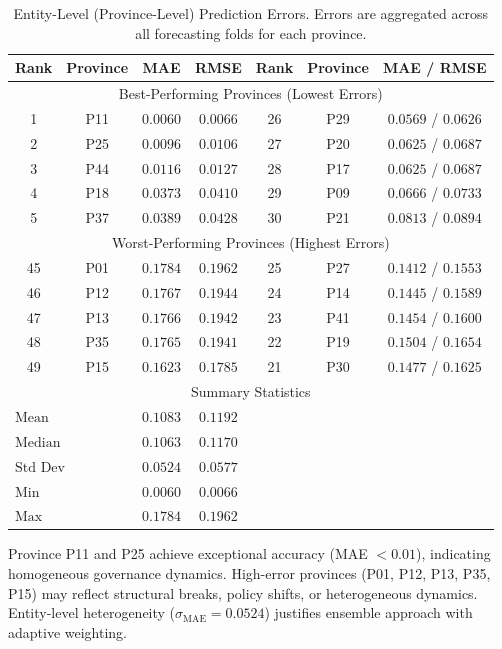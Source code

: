 \begin{table}[!htbp]
\centering
\caption{%
    Entity-Level (Province-Level) Prediction Errors.
    Errors are aggregated across all forecasting folds for each province.
}
\label{tab:entity_errors}
\small
\begin{tabular}{ccccccc}
\toprule
\multicolumn{1}{c}{\textbf{Rank}} & \textbf{Province} & \textbf{MAE} & \textbf{RMSE} 
    & \multicolumn{1}{c}{\textbf{Rank}} & \textbf{Province} & \textbf{MAE} / \textbf{RMSE} \\
\midrule
\multicolumn{7}{c}{\small Best-Performing Provinces (Lowest Errors)} \\
1  & P11 & $0.0060$ & $0.0066$ & 26 & P29 & $0.0569$ / $0.0626$ \\
2  & P25 & $0.0096$ & $0.0106$ & 27 & P20 & $0.0625$ / $0.0687$ \\
3  & P44 & $0.0116$ & $0.0127$ & 28 & P17 & $0.0625$ / $0.0687$ \\
4  & P18 & $0.0373$ & $0.0410$ & 29 & P09 & $0.0666$ / $0.0733$ \\
5  & P37 & $0.0389$ & $0.0428$ & 30 & P21 & $0.0813$ / $0.0894$ \\
\midrule
\multicolumn{7}{c}{\small Worst-Performing Provinces (Highest Errors)} \\
45 & P01  & $0.1784$ & $0.1962$ & 25 & P27 & $0.1412$ / $0.1553$ \\
46 & P12  & $0.1767$ & $0.1944$ & 24 & P14 & $0.1445$ / $0.1589$ \\
47 & P13  & $0.1766$ & $0.1942$ & 23 & P41 & $0.1454$ / $0.1600$ \\
48 & P35  & $0.1765$ & $0.1941$ & 22 & P19 & $0.1504$ / $0.1654$ \\
49 & P15  & $0.1623$ & $0.1785$ & 21 & P30 & $0.1477$ / $0.1625$ \\
\midrule
\multicolumn{7}{c}{\small Summary Statistics} \\
\multicolumn{2}{l}{$\text{Mean}$}  & $0.1083$ & $0.1192$ \\
\multicolumn{2}{l}{$\text{Median}$}  & $0.1063$ & $0.1170$ \\
\multicolumn{2}{l}{$\text{Std Dev}$}  & $0.0524$ & $0.0577$ \\
\multicolumn{2}{l}{$\text{Min}$}  & $0.0060$ & $0.0066$ \\
\multicolumn{2}{l}{$\text{Max}$}  & $0.1784$ & $0.1962$ \\
\bottomrule
\end{tabular}
\begin{flushleft}
\footnotesize
Province P11 and P25 achieve exceptional accuracy (MAE $< 0.01$), indicating homogeneous governance dynamics.
High-error provinces (P01, P12, P13, P35, P15) may reflect structural breaks, policy shifts, or heterogeneous dynamics.
Entity-level heterogeneity ($\sigma_{\text{MAE}} = 0.0524$) justifies ensemble approach with adaptive weighting.
\end{flushleft}
\end{table}


